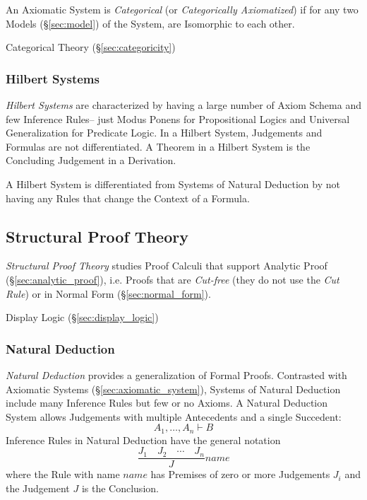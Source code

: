An Axiomatic System is \emph{Categorical} (or \emph{Categorically
  Axiomatized}) if for any two Models (\S\ref{sec:model}) of the
System, are Isomorphic to each other.

Categorical Theory (\S\ref{sec:categoricity})



\subsubsection{Hilbert Systems}\label{sec:hilbert_system}

\emph{Hilbert Systems} are characterized by having a large number of
Axiom Schema and few Inference Rules-- just Modus Ponens for
Propositional Logics and Universal Generalization for Predicate
Logic. In a Hilbert System, Judgements and Formulas are not
differentiated. A Theorem in a Hilbert System is the Concluding
Judgement in a Derivation.

A Hilbert System is differentiated from Systems of Natural Deduction
by not having any Rules that change the Context of a Formula.



\subsection{Structural Proof Theory}\label{sec:structural_proof}

\emph{Structural Proof Theory} studies Proof Calculi that support
Analytic Proof (\S\ref{sec:analytic_proof}), i.e. Proofs that are
\emph{Cut-free} (they do not use the \emph{Cut Rule}) or in Normal
Form (\S\ref{sec:normal_form}).

\fist Display Logic (\S\ref{sec:display_logic})



\subsubsection{Natural Deduction}\label{sec:natural_deduction}
\cite{prawitz65}

\emph{Natural Deduction} provides a generalization of Formal Proofs.
Contrasted with Axiomatic Systems (\S\ref{sec:axiomatic_system}),
Systems of Natural Deduction include many Inference Rules but few or
no Axioms. A Natural Deduction System allows Judgements with multiple
Antecedents and a single Succedent:
\[
  A_1,\ldots,A_n \vdash B
\]
Inference Rules in Natural Deduction have the general notation
\[
  {
    \frac{J_1 \quad J_2 \quad \cdots \quad J_n}
    {J}
  } name
\]
where the Rule with name $name$ has Premises of zero or more
Judgements $J_i$ and the Judgement $J$ is the Conclusion.

